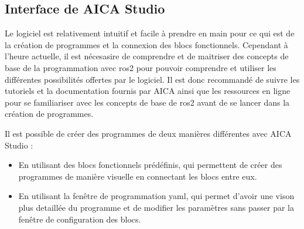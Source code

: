 \subsection{Interface de AICA Studio}
Le logiciel est relativement intuitif et facile à prendre en main pour ce qui est de la création de programmes et la connexion des blocs fonctionnels. Cependant à l'heure actuelle, il est nécesasire de comprendre et de maitriser des concepts de base de la programmation avec \gls{ros2} pour pouvoir comprendre et utiliser les différentes possibilités offertes par le logiciel. Il est donc recommandé de suivre les tutoriels et la documentation fournis par AICA ainsi que les ressources en ligne pour se familiariser avec les concepts de base de \gls{ros2} avant de se lancer dans la création de programmes.

Il est possible de créer des programmes de deux manières différentes avec AICA Studio :
\begin{itemize}
    \item En utilisant des blocs fonctionnels prédéfinis, qui permettent de créer des programmes de manière visuelle en connectant les blocs entre eux.
    \item En utilisant la fenêtre de programmation \gls{yaml}, qui permet d'avoir une vison plus detaillée du programme et de modifier les paramètres sans passer par la fenêtre de configuration des blocs.
\end{itemize}

